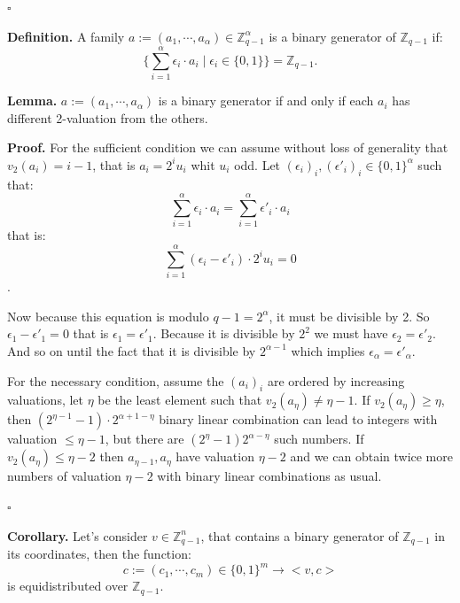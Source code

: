 \documentclass{article}
\begin{document}
\hfill $\square$

\vspace{0.3cm}

\textbf{Definition.}
A family $a:=(a_1,\cdots,a_{\alpha}) \in \mathbb{Z}_{q-1}^{\alpha}$ is a binary generator of $\mathbb{Z}_{q-1}$ if:
\[
\{\sum_{i=1}^{\alpha} \epsilon_i \cdot a_i \mid \epsilon_i \in \{0,1\}\} = \mathbb{Z}_{q-1}.
\]

\vspace{0.3cm}

\textbf{Lemma.}
$a:=(a_1,\cdots,a_{\alpha})$ is a binary generator if and only if each $a_i$ has different 2-valuation  from the others.

\vspace{0.3cm}

\textbf{Proof.} 
For the sufficient condition we can assume without loss of generality that $v_2(a_i)=i-1$, that is $a_i = 2^i u_i$ whit $u_i$ odd.
Let $(\epsilon_i)_i, (\epsilon'_i)_i \in \{0,1\}^{\alpha}$ such that:
\[
\sum_{i=1}^{\alpha} \epsilon_i \cdot a_i =\sum_{i=1}^{\alpha} \epsilon'_i \cdot a_i
\]
that is:
\[
\sum_{i=1}^{\alpha} (\epsilon_i -\epsilon'_i)\cdot 2^i u_i =0 
\].

Now because this equation is modulo $q-1=2^{\alpha}$, it must be divisible by 2. So $\epsilon_1 -\epsilon'_1=0$ that is $\epsilon_1 =\epsilon'_1$. Because it is divisible by $2^2$ we must have $\epsilon_2 =\epsilon'_2$. And so on until the fact that it is divisible by $2^{\alpha -1}$ which implies $\epsilon_{\alpha} =\epsilon'_{\alpha}$.

\vspace{0.3cm}

For the necessary condition, assume the $(a_i)_i$ are ordered by increasing valuations, let $\eta$ be the least element such that $v_2(a_{\eta}) \neq \eta -1$. If $ v_2(a_{\eta}) \geq \eta$, then $(2 ^{\eta-1} - 1)\cdot 2^{\alpha +1 -\eta}$ binary linear combination can lead to integers with valuation $\leq \eta-1$, but there are $(2^{\eta}-1) 2^{\alpha-\eta}$ such numbers.  If $ v_2(a_{\eta}) \leq \eta -2 $ then $a_{\eta-1}, a_{\eta}$ have valuation $\eta-2$ and we can obtain twice more numbers of valuation $\eta -2$ with binary linear combinations as usual.

\hfill $\square$

\vspace{0.3cm}

\textbf{Corollary.}
Let's consider $v \in \mathbb{Z}_{q-1}^n$, that contains a binary generator of $\mathbb{Z}_{q-1}$ in its coordinates, then the function:
\[
c:=(c_1,\cdots,c_m) \in \{0,1\}^m \to <v,c>
\]
is equidistributed over $\mathbb{Z}_{q-1}$.
\end{document}
